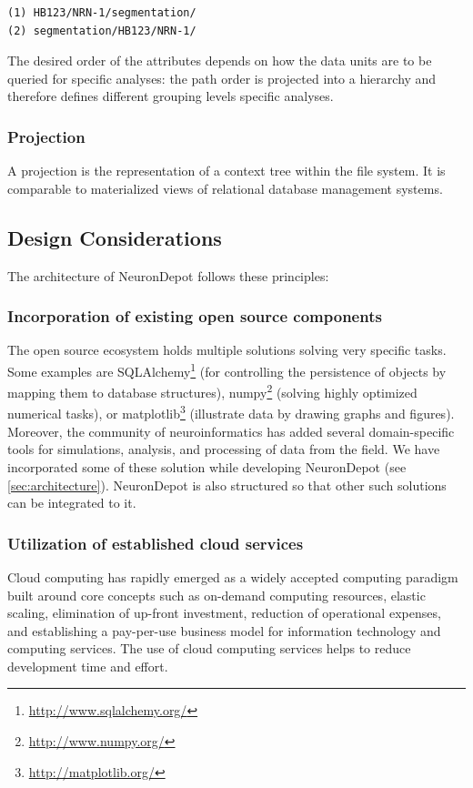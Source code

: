 \documentclass{frontiersSCNS} %
\begin{document}
\begin{lstlisting}[style=display]
(1) HB123/NRN-1/segmentation/
(2) segmentation/HB123/NRN-1/
\end{lstlisting}

The desired order of the attributes depends on how the data units are to be
queried for specific analyses: the path order is projected into a hierarchy and
therefore defines different grouping levels specific analyses.

\subsubsection{Projection}

A projection is the representation of a context tree within the file system. It
is comparable to materialized views of relational database management systems.


\subsection{Design Considerations}
The architecture of NeuronDepot follows these principles:

\subsubsection{Incorporation of existing open source components}

The open source ecosystem holds multiple solutions solving very specific tasks.
Some examples are SQLAlchemy\footnote{\url{http://www.sqlalchemy.org/}} (for
controlling the persistence of objects by mapping them to database structures),
numpy\footnote{\url{http://www.numpy.org/}} (solving highly optimized numerical
tasks), or matplotlib\footnote{\url{http://matplotlib.org/}} (illustrate data by
drawing graphs and figures). Moreover, the community of neuroinformatics has
added several domain-specific tools for simulations, analysis, and processing of
data from the field. We have incorporated some of these solution while
developing NeuronDepot (see \ref{sec:architecture}). NeuronDepot is also structured
so that other such solutions can be integrated to it.

\subsubsection{Utilization of established cloud services}

Cloud computing has rapidly emerged as a widely
accepted computing paradigm built around core concepts such as on-demand
computing resources, elastic scaling, elimination of up-front investment,
reduction of operational expenses, and establishing a pay-per-use business
model for information technology and computing services. The use of cloud computing
services helps to reduce development time and effort.
\end{document}
